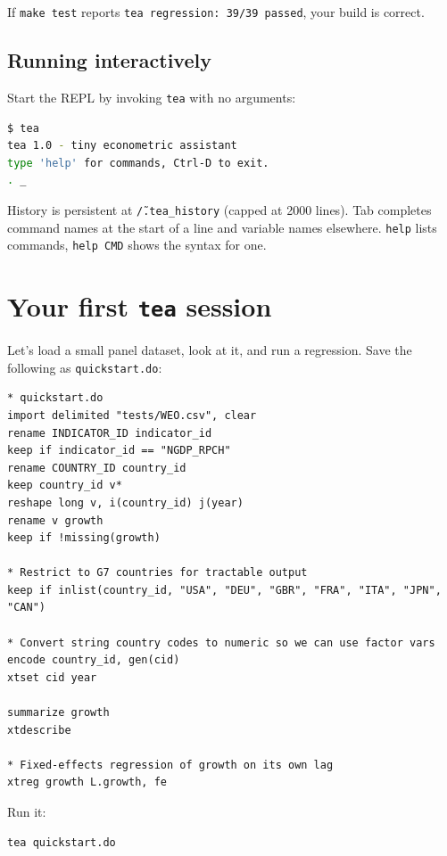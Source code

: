 \documentclass[11pt,letterpaper]{article}
\begin{document}
If \texttt{make test} reports \texttt{tea regression: 39/39 passed},
your build is correct.

\subsection{Running interactively}

Start the REPL by invoking \texttt{tea} with no arguments:

\begin{lstlisting}[language=bash]
$ tea
tea 1.0 - tiny econometric assistant
type 'help' for commands, Ctrl-D to exit.
. _
\end{lstlisting}

History is persistent at \texttt{\~/.tea\_history} (capped at 2000 lines).
Tab completes command names at the start of a line and variable names
elsewhere.  \texttt{help} lists commands, \texttt{help CMD} shows the
syntax for one.

\section{Your first \texttt{tea} session}\label{sec:quickstart}

Let's load a small panel dataset, look at it, and run a regression.
Save the following as \texttt{quickstart.do}:

\begin{lstlisting}
* quickstart.do
import delimited "tests/WEO.csv", clear
rename INDICATOR_ID indicator_id
keep if indicator_id == "NGDP_RPCH"
rename COUNTRY_ID country_id
keep country_id v*
reshape long v, i(country_id) j(year)
rename v growth
keep if !missing(growth)

* Restrict to G7 countries for tractable output
keep if inlist(country_id, "USA", "DEU", "GBR", "FRA", "ITA", "JPN", "CAN")

* Convert string country codes to numeric so we can use factor vars
encode country_id, gen(cid)
xtset cid year

summarize growth
xtdescribe

* Fixed-effects regression of growth on its own lag
xtreg growth L.growth, fe
\end{lstlisting}

Run it:

\begin{lstlisting}[language=bash]
tea quickstart.do
\end{lstlisting}
\end{document}
